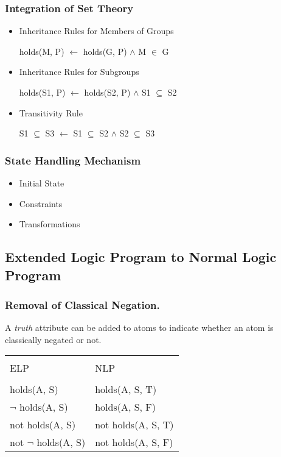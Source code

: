 \documentclass{llncs}
\begin{document}
      \subsubsection{Integration of Set Theory}

        \begin{itemize}
          \item
            Inheritance Rules for Members of Groups

            holds(M, P) $\leftarrow$ holds(G, P) $\land$ M $\in$ G
          \item
            Inheritance Rules for Subgroups

            holds(S1, P) $\leftarrow$ holds(S2, P) $\land$ S1 $\subseteq$ S2
          \item
            Transitivity Rule

            S1 $\subseteq$ S3 $\leftarrow$ S1 $\subseteq$ S2 $\land$ S2 $\subseteq$ S3
        \end{itemize}

      \subsubsection{State Handling Mechanism}

        \begin{itemize}
          \item
            Initial State
          \item
            Constraints
          \item
            Transformations
        \end{itemize}

    \subsection{Extended Logic Program to Normal Logic Program}

      \subsubsection{Removal of Classical Negation.}
        A \emph{truth} attribute can be added to atoms to indicate whether
        an atom is classically negated or not.

        \vspace{0.65cm}

        \begin{table}
          \begin{tabular}{ll}
            \hline \\
            ELP & NLP \\
            \hline \\
            holds(A, S) & holds(A, S, T) \\
            $\lnot$ holds(A, S) & holds(A, S, F) \\
            not holds(A, S) & not holds(A, S, T) \\
            not $\lnot$ holds(A, S) & not holds(A, S, F) \\
            \hline
          \end{tabular}
        \end{table}
\end{document}
